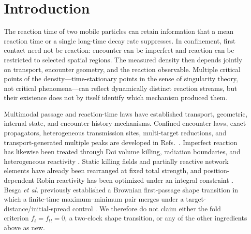 \documentclass[aps,pre,reprint,amsmath,amssymb,longbibliography,floatfix]{revtex4-2}
\begin{document}
\maketitle

\section{Introduction}
\label{sec:introduction}

The reaction time of two mobile particles can retain information that a mean
reaction time or a single long-time decay rate suppresses. In confinement,
first contact need not be reaction: encounter can be imperfect and
reaction can be restricted to selected spatial regions. The measured density
then depends jointly on transport, encounter geometry, and the reaction
observable. Multiple critical points of the density---time-stationary points in the
sense of singularity theory, not critical phenomena---can reflect
dynamically distinct
reaction streams, but their existence does not by itself identify which
mechanism produced them.

Multimodal passage and reaction-time laws have established transport,
geometric, internal-state, and encounter-history mechanisms. Confined
encounter laws, exact propagators, heterogeneous transmission sites,
multi-target reductions, and transport-generated multiple peaks are developed
in Refs.~\cite{levot2020firstencounter,levot2022firstencounter,
giuggioli2013encounter,giuggioli2020exact,
giuggioliSarvaharman2022transmission,sarvaharmanGiuggioli2023particle,
sarvaharmanGiuggioli2020biased,marrisGiuggioli2024persistent,
giuggioliEtAl2024multitarget}. Imperfect reaction has likewise been treated
through Doi volume killing, radiation boundaries, and heterogeneous
reactivity \cite{doi1976stochastic,isaacson2009rdme,
isaacsonMauroNewby2016uniform,chapmanErbanIsaacson2016reactive,
grebenkov2019spectral,grebenkov2020sphericaltraps}. Static killing fields and
partially reactive network elements have already been rearranged at fixed
total strength, and position-dependent Robin reactivity has been optimized
under an integral constraint
\cite{nguyenGrebenkov2010porous,scottEtAl2021tubular,
nicolaouMulder2023flux}. Besga \emph{et al.} previously established a Brownian
first-passage shape transition in which a finite-time maximum--minimum pair
merges under a target-distance/initial-spread control
\cite{besgaEtAl2021dynamical}. We therefore do not claim either the fold
criterion \(f_t=f_{tt}=0\), a two-clock shape transition, or any of the other
ingredients above as new.
\end{document}
